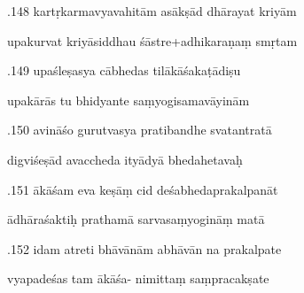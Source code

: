 \documentclass[article,12pt,a4paper]{memoir}%
\newcounter{parCount}
\begin{document}
	  
	  \pstart {}.148  kartṛkarmavyavahitām asākṣād dhārayat kriyām 
	{}
	\pend%
      

	  
	  \pstart \leavevmode%
	upakurvat kriyāsiddhau śāstre+adhikaraṇaṃ smṛtam 
	{}
	\pend%
      

	  
	  \pstart {}.149 upaśleṣasya cābhedas tilākāśakaṭādiṣu 
	{}
	\pend%
      

	  
	  \pstart \leavevmode%
	upakārās tu bhidyante saṃyogisamavāyinām 
	{}
	\pend%
      

	  
	  \pstart {}.150 avināśo gurutvasya pratibandhe svatantratā 
	{}
	\pend%
      

	  
	  \pstart \leavevmode%
	digviśeṣād avaccheda ityādyā bhedahetavaḥ 
	{}
	\pend%
      

	  
	  \pstart {}.151 ākāśam eva keṣāṃ cid deśabhedaprakalpanāt 
	{}
	\pend%
      

	  
	  \pstart \leavevmode%
	ādhāraśaktiḥ prathamā sarvasaṃyogināṃ matā 
	{}
	\pend%
      

	  
	  \pstart {}.152 idam atreti bhāvānām abhāvān na prakalpate 
	{}
	\pend%
      

	  
	  \pstart \leavevmode%
	vyapadeśas tam ākāśa- nimittaṃ saṃpracakṣate 
	{}
	\pend%
      
\end{document}
